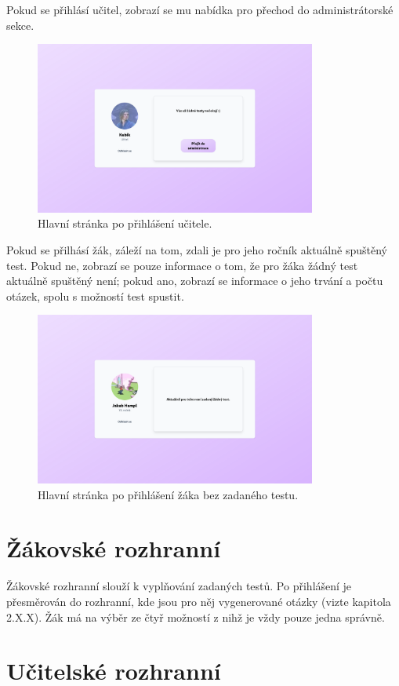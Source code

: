 Pokud se přihlásí učitel, zobrazí se mu nabídka pro přechod do administrátorské sekce.

\begin{figure}[H]
    \centering
    \includegraphics[width=350px]{images/01design/teacher.png}
    \caption{Hlavní stránka po přihlášení učitele.}
\end{figure}

Pokud se přilhásí žák, záleží na tom, zdali je pro jeho ročník aktuálně spuštěný test. Pokud ne, zobrazí se pouze informace o tom, že pro žáka žádný test aktuálně spuštěný není; pokud ano, zobrazí se informace o jeho trvání a počtu otázek, spolu s možností test spustit.

\begin{figure}[H]
    \centering
    \includegraphics[width=350px]{images/01design/student-no-test.png}
    \caption{Hlavní stránka po přihlášení žáka bez zadaného testu.}
\end{figure}

\section{Žákovské rozhranní}

Žákovské rozhranní slouží k vyplňování zadaných testů. Po přihlášení je přesměrován do rozhranní, kde jsou pro něj vygenerované otázky (vizte kapitola 2.X.X). Žák má na výběr ze čtyř možností z nihž je vždy pouze jedna správně.

\section{Učitelské rozhranní}